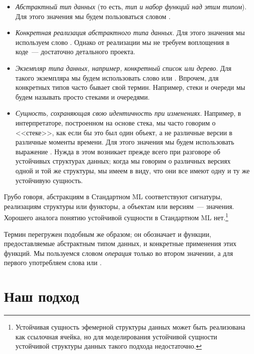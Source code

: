 \begin{itemize}
\item \emph{Абстрактный тип данных} (то есть,
  \emph{тип и набор функций над этим типом}). Для этого значения мы
  будем пользоваться словом .
\item \emph{Конкретная реализация абстрактного типа данных}. Для этого
  значения мы используем слово
  . Однако от реализации мы не требуем
  воплощения в коде~--- достаточно детального проекта.
\item \emph{Экземпляр типа данных, например, конкретный список или
    дерево}. Для такого экземпляра мы будем использовать слово
   или . Впрочем,
  для конкретных типов часто бывает свой термин. Например, стеки и
  очереди мы будем называть просто стеками и очередями.
\item \emph{Сущность, сохраняющая свою идентичность при
    изменениях}. Например, в интерпретаторе, построенном на основе
  стека, мы часто говорим о <<стеке>>, как если бы это был один
  объект, а не различные версии в различные моменты времени. Для этого
  значения мы будем использовать выражение .  Нужда в этом возникает прежде
  всего при разговоре об устойчивых структурах данных; когда мы
  говорим о различных версиях одной и той же структуры, мы имеем в
  виду, что они все имеют одну и ту же устойчивую сущность.
\end{itemize}
Грубо говоря, абстракциям в Стандартном ML соответствуют сигнатуры,
реализациям структуры или функторы, а объектам или версиям~---
значения. Хорошего аналога понятию устойчивой сущности в Стандартном
ML нет.\footnote{%
  Устойчивая сущность эфемерной структуры данных может быть
  реализована как ссылочная ячейка, но для моделирования устойчивой
  сущности устойчивой структуры данных такого подхода недостаточно.
}

Термин  перегружен подобным же образом; он
обозначает и функции, предоставляемые абстрактным типом данных, и
конкретные применения этих функций. Мы пользуемся словом
\emph{операция} только во втором значении, а для первого употребляем
слова  или .

\section{Наш подход}

